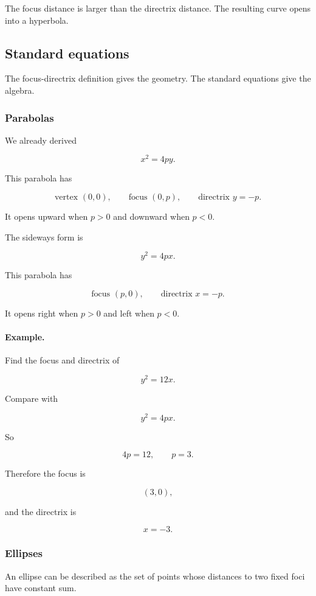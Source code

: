 The focus distance is larger than the directrix distance.  The resulting curve opens into
a hyperbola.

\subsection{Standard equations}
\label{subsec:standard-equations-conics}

The focus-directrix definition gives the geometry.  The standard equations give the
algebra.

\subsubsection*{Parabolas}

We already derived

\[
\boxed{
x^2=4py.
}
\]

This parabola has

\[
\text{vertex }(0,0),
\qquad
\text{focus }(0,p),
\qquad
\text{directrix }y=-p.
\]

It opens upward when \(p>0\) and downward when \(p<0\).

The sideways form is

\[
\boxed{
y^2=4px.
}
\]

This parabola has

\[
\text{focus }(p,0),
\qquad
\text{directrix }x=-p.
\]

It opens right when \(p>0\) and left when \(p<0\).

\paragraph{Example.}
Find the focus and directrix of

\[
y^2=12x.
\]

Compare with

\[
y^2=4px.
\]

So

\[
4p=12,
\qquad
p=3.
\]

Therefore the focus is

\[
(3,0),
\]

and the directrix is

\[
x=-3.
\]

\subsubsection*{Ellipses}

An ellipse can be described as the set of points whose distances to two fixed foci have
constant sum.

